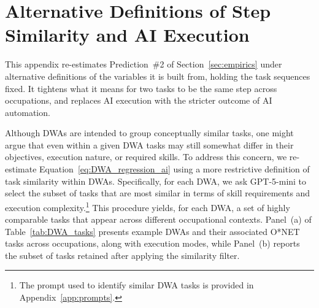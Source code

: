 \section{Alternative Definitions of Step Similarity and AI Execution}
\label{app:additional_robustness}
\suppressfloats[t]

This appendix re-estimates Prediction~\#2 of Section~\ref{sec:empirics} under alternative definitions of the variables it is built from, holding the task sequences fixed.
It tightens what it means for two tasks to be the same step across occupations, and replaces AI execution with the stricter outcome of AI automation.

Although DWAs are intended to group conceptually similar tasks, one might argue that even within a given DWA tasks may still somewhat differ in their objectives, execution nature, or required skills.
To address this concern, we re-estimate Equation~\eqref{eq:DWA_regression_ai} using a more restrictive definition of task similarity within DWAs.
Specifically, for each DWA, we ask GPT-5-mini to select the subset of tasks that are most similar in terms of skill requirements and execution complexity.\footnote{The prompt used to identify similar DWA tasks is provided in Appendix~\ref{app:prompts}.}
This procedure yields, for each DWA, a set of highly comparable tasks that appear across different occupational contexts.
Panel~(a) of Table~\ref{tab:DWA_tasks} presents example DWAs and their associated O*NET tasks across occupations, along with execution modes, while Panel~(b) reports the subset of tasks retained after applying the similarity filter.

